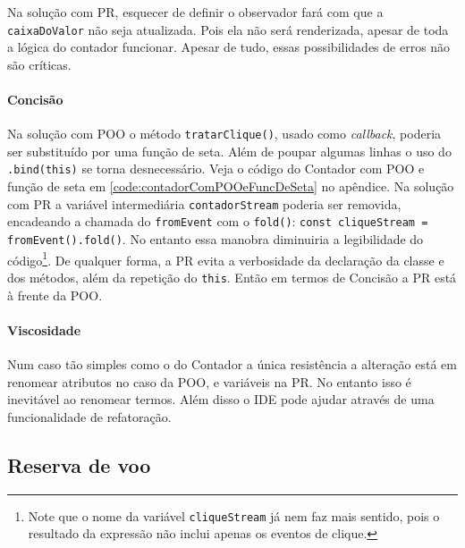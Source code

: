Na solução com PR, esquecer de definir o observador fará com que a
\texttt{caixaDoValor} não seja atualizada.
Pois ela não será renderizada, apesar de toda a lógica do contador
funcionar.
Apesar de tudo, essas possibilidades de erros não são críticas.
\paragraph{Concisão}
\label{sec:org5f355ae}
Na solução com POO o método \texttt{tratarClique()}, usado como \emph{callback},
poderia ser substituído por uma função de seta.
Além de poupar algumas linhas o uso do \texttt{.bind(this)} se torna
desnecessário.
Veja o código do Contador com POO e função de seta em
\ref{code:contadorComPOOeFuncDeSeta} no apêndice.
Na solução com PR a variável intermediária \texttt{contadorStream} poderia ser
removida, encadeando a chamada do \texttt{fromEvent} com o \texttt{fold()}:
\texttt{const cliqueStream = fromEvent().fold()}.
No entanto essa manobra diminuiria a legibilidade do
código\footnote{Note que o nome da variável \texttt{cliqueStream} já nem faz mais
sentido, pois o resultado da expressão não inclui apenas os eventos de clique.}.
De qualquer forma, a PR evita a verbosidade da declaração da classe e dos
métodos, além da repetição do \texttt{this}.
Então em termos de Concisão a PR está à frente da POO.
\paragraph{Viscosidade}
\label{sec:org5576235}
Num caso tão simples como o do Contador a única resistência a alteração
está em renomear atributos no caso da POO, e variáveis na PR.
No entanto isso é inevitável ao renomear termos.
Além disso o IDE pode ajudar através de uma funcionalidade de refatoração.
\subsection{Reserva de voo}
\label{sec:orgc441a63}
